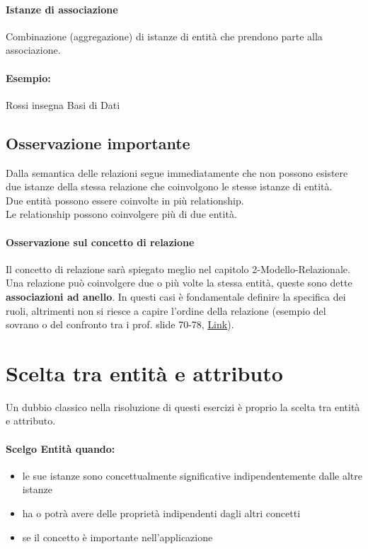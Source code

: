 \paragraph*{Istanze di associazione}
Combinazione (aggregazione) di istanze di entità che prendono parte alla associazione.
\paragraph*{Esempio:} Rossi insegna Basi di Dati
\subsection*{Osservazione importante}
Dalla semantica delle relazioni segue immediatamente che non possono esistere due
istanze della stessa relazione che coinvolgono le stesse istanze di entità.
\\ Due entità possono essere coinvolte in più relationship.
\\ Le relationship possono coinvolgere più di due entità.

\paragraph*{Osservazione sul concetto di relazione} Il concetto di relazione sarà
spiegato meglio nel capitolo 2-Modello-Relazionale.
Una relazione può coinvolgere due o più volte la stessa entità, queste sono
dette \textbf{associazioni ad anello}. In questi casi è fondamentale definire
la specifica dei ruoli, altrimenti non si riesce a capire l'ordine della relazione
(esempio del sovrano o del confronto tra i prof. slide 70-78, 
\href{https://elearning.unimib.it/pluginfile.php/1486876/mod_resource/content/1/Modello%20ER.pdf}{Link}).
\section{Scelta tra entità e attributo}
Un dubbio classico nella risoluzione di questi esercizi è proprio la scelta tra
entità e attributo.
\paragraph*{Scelgo Entità quando:}
\begin{itemize}
    \item le sue istanze sono concettualmente significative indipendentemente dalle altre istanze
    \item ha o potrà avere delle proprietà indipendenti dagli altri concetti
    \item se il concetto è importante nell'applicazione
\end{itemize}
